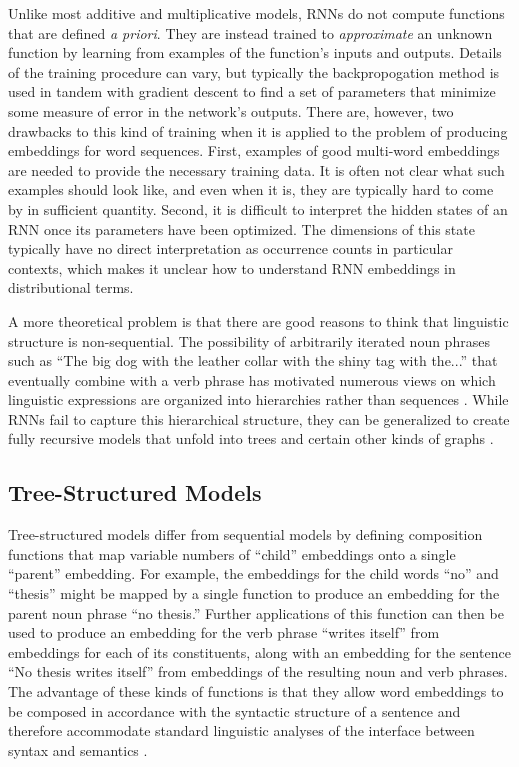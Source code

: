 Unlike most additive and multiplicative models, RNNs do not compute functions that are defined \textit{a priori}. They are instead trained to \textit{approximate} an unknown function by learning from examples of the function's inputs and outputs. Details of the training procedure can vary, but typically the backpropogation method is used in tandem with gradient descent to find a set of parameters that minimize some measure of error in the network's outputs. There are, however, two drawbacks to this kind of training when it is applied to the problem of producing embeddings for word sequences. First, examples of good multi-word embeddings are needed to provide the necessary training data. It is often not clear what such examples should look like, and even when it is, they are typically hard to come by in sufficient quantity. Second, it is difficult to interpret the hidden states of an RNN once its parameters have been optimized. The dimensions of this state typically have no direct interpretation as occurrence counts in particular contexts, which makes it unclear how to understand RNN embeddings in distributional terms. 

A more theoretical problem is that there are good reasons to think that linguistic structure is non-sequential. The possibility of arbitrarily iterated noun phrases such as ``The big dog with the leather collar with the shiny tag with the...'' that eventually combine with a verb phrase has motivated numerous views on which linguistic expressions are organized into hierarchies rather than sequences \citep{Pinker:1994,Harley:2014}. While RNNs fail to capture this hierarchical structure, they can be generalized to create fully recursive models that unfold into trees and certain other kinds of graphs \citep{Socher:2012,Socher:2014,Bottou:2014}. 

\subsection{Tree-Structured Models}

Tree-structured models differ from sequential models by defining composition functions that map variable numbers of ``child'' embeddings onto a single ``parent'' embedding. For example, the embeddings for the child words ``no'' and ``thesis'' might be mapped by a single function to produce an embedding for the parent noun phrase ``no thesis.'' Further applications of this function can then be used to produce an embedding for the verb phrase ``writes itself'' from embeddings for each of its constituents, along with an embedding for the sentence ``No thesis writes itself'' from embeddings of the resulting noun and verb phrases. The advantage of these kinds of functions is that they allow word embeddings to be composed in accordance with the syntactic structure of a sentence and therefore accommodate standard linguistic analyses of the interface between syntax and semantics \citep[see e.g.,][]{Szabo:2012}. 


